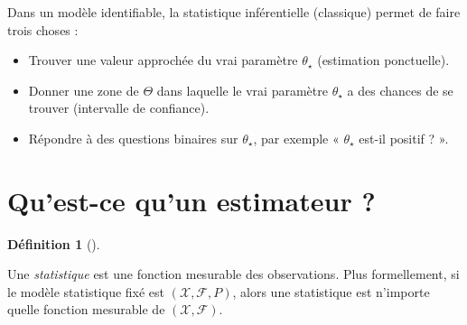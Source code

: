 \documentclass[
  10,
  letterpaper,
  DIV=11,
  numbers=noendperiod]{scrreport}
\providecommand{\tightlist}{%
  \setlength{\itemsep}{0pt}\setlength{\parskip}{0pt}}\usepackage{longtable,booktabs,array}
\theoremstyle{plain}
\theoremstyle{definition}
\theoremstyle{plain}
\theoremstyle{definition}
\newtheorem{definition}{Définition}[chapter]
\theoremstyle{definition}
\theoremstyle{plain}
\theoremstyle{remark}
\begin{document}
Dans un modèle identifiable, la statistique inférentielle (classique)
permet de faire trois choses :

\begin{itemize}
\tightlist
\item
  Trouver une valeur approchée du vrai paramètre \(\theta_\star\)
  (estimation ponctuelle).
\item
  Donner une zone de \(\Theta\) dans laquelle le vrai paramètre
  \(\theta_\star\) a des chances de se trouver (intervalle de
  confiance).
\item
  Répondre à des questions binaires sur \(\theta_\star\), par exemple «
  \(\theta_\star\) est-il positif ? ».
\end{itemize}

\hypertarget{quest-ce-quun-estimateur}{%
\section{Qu'est-ce qu'un estimateur ?}\label{quest-ce-quun-estimateur}}

\begin{definition}[]\protect\hypertarget{def-stat}{}\label{def-stat}

Une \emph{statistique} est une fonction mesurable des observations. Plus
formellement, si le modèle statistique fixé est
\((\mathcal{X}, \mathscr{F}, P)\), alors une statistique est n'importe
quelle fonction mesurable de \((\mathcal{X}, \mathscr{F})\).

\end{definition}
\end{document}
